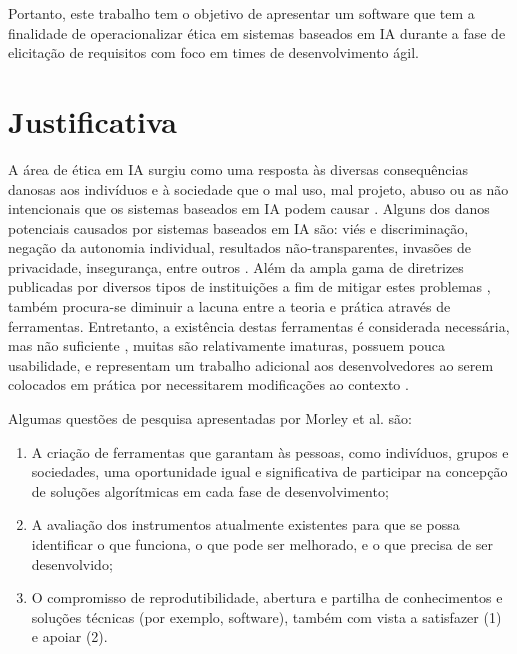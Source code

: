 Portanto, este trabalho tem o objetivo de apresentar um software que tem a finalidade de operacionalizar ética em sistemas baseados em IA durante a fase de elicitação de requisitos com foco em times de desenvolvimento ágil.

\section{Justificativa}%

A área de ética em IA surgiu como uma resposta às diversas consequências danosas aos indivíduos e à sociedade que o mal uso, mal projeto, abuso ou as não intencionais que os sistemas baseados em IA podem causar \cite{leslie2019understanding}. Alguns dos danos potenciais causados por sistemas baseados em IA são: viés e discriminação, negação da autonomia individual, resultados não-transparentes, invasões de privacidade, insegurança, entre outros \cite{leslie2019understanding}. Além da ampla gama de diretrizes publicadas por diversos tipos de instituições a fim de mitigar estes problemas \cite{jobin2019global}, também procura-se diminuir a lacuna entre a teoria e prática através de ferramentas. Entretanto, a existência destas ferramentas é considerada necessária, mas não suficiente \cite{morley2021EthicsAsAService}, muitas são relativamente imaturas, possuem pouca usabilidade, e representam um trabalho adicional aos desenvolvedores ao serem colocados em prática por necessitarem modificações ao contexto \cite{morley2019initial,vakkuri2020current,siqueira2021ethical,ECCOLA}.

Algumas questões de pesquisa apresentadas por Morley et al. \cite{morley2019initial} são:

\begin{enumerate}
    \item A criação de ferramentas que garantam às pessoas, como indivíduos, grupos e sociedades, uma oportunidade igual e significativa de participar na concepção de soluções algorítmicas em cada fase de desenvolvimento;
    \item A avaliação dos instrumentos atualmente existentes para que se possa identificar o que funciona, o que pode ser melhorado, e o que precisa de ser desenvolvido;
    \item O compromisso de reprodutibilidade, abertura e partilha de conhecimentos e soluções técnicas (por exemplo, software), também com vista a satisfazer (1) e apoiar (2).
\end{enumerate}

